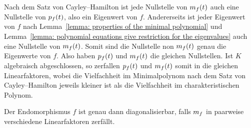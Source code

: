 Nach dem Satz von Cayley--Hamilton ist jede Nullstelle von $m_{f}(t)$ auch eine Nullstelle von $p_{f}(t)$, also ein Eigenwert von $f$.
Andererseits ist jeder Eigenwert von $f$ nach Lemma~\ref{lemma: properties of the minimal polynomial} und Lemma~\ref{lemma: polynomial equations give restriction for the eigenvalues} auch eine Nullstelle von $m_{f}(t)$.
Somit sind die Nullstelle non $m_{f}(t)$ genau die Eigenwerte von $f$.
Also haben $p_{f}(t)$ und $m_{f}(t)$ die gleichen Nullstellen.
Ist $K$ algebraisch abgeschlossen, so zerfallen $p_{f}(t)$ und $m_{f}(t)$ somit in die gleichen Linearfaktoren, wobei die Vielfachheit im Minimalpolynom nach dem Satz von Cayley--Hamilton jeweils kleiner ist als die Vielfachheit im charakteristischen Polynom.

\begin{proposition}
  Der Endomorphismus $f$ ist genau dann diagonalisierbar, falls $m_{f}$ in paarweise verschiedene Linearfaktoren zerfällt.
\end{proposition}




